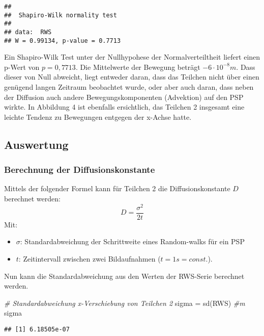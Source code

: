 \documentclass[class=article, crop=false]{standalone}
\newenvironment{Shaded}{\begin{snugshade}}{\end{snugshade}}
\newcommand{\CommentTok}[1]{\textcolor[rgb]{0.56,0.35,0.01}{\textit{#1}}}
\newcommand{\FunctionTok}[1]{\textcolor[rgb]{0.00,0.00,0.00}{#1}}
\newcommand{\NormalTok}[1]{#1}
\newcommand{\OtherTok}[1]{\textcolor[rgb]{0.56,0.35,0.01}{#1}}
\begin{document}
\begin{verbatim}
## 
##  Shapiro-Wilk normality test
## 
## data:  RWS
## W = 0.99134, p-value = 0.7713
\end{verbatim}

Ein Shapiro-Wilk Test unter der Nullhypohese der Normalverteiltheit
liefert einen p-Wert von \(p = 0,7713\). Die Mittelwerte der Bewegung
beträgt \(-6\cdot10^{-8}m\). Dass dieser von Null abweicht, liegt
entweder daran, dass das Teilchen nicht über einen genügend langen
Zeitraum beobachtet wurde, oder aber auch daran, dass neben der
Diffusion auch andere Bewegungskomponenten (Advektion) auf den PSP
wirkte. In Abbildung 4 ist ebenfalls ersichtlich, das Teilchen 2
insgesamt eine leichte Tendenz zu Bewegungen entgegen der x-Achse hatte.

\hypertarget{auswertung}{%
\subsection{Auswertung}\label{auswertung}}

\hypertarget{berechnung-der-diffusionskonstante}{%
\subsubsection{Berechnung der
Diffusionskonstante}\label{berechnung-der-diffusionskonstante}}

Mittels der folgender Formel kann für Teilchen 2 die Diffusionskonstante
\(D\) berechnet werden: \[D=\frac{\sigma^2}{2t}\] Mit:

\begin{itemize}
\item $\sigma$: Standardabweichung der Schrittweite eines Random-walks für ein PSP
\item $t$: Zeitintervall zwischen zwei Bildaufnahmen ($t=1s=const.$).
\end{itemize}

Nun kann die Standardabweichung aus den Werten der RWS-Serie berechnet
werden.

\begin{Shaded}
\begin{Highlighting}[]
\CommentTok{\# Standardabweichung x{-}Verschiebung von Teilchen 2}
\NormalTok{sigma }\OtherTok{=} \FunctionTok{sd}\NormalTok{(RWS) }\CommentTok{\#m}
\NormalTok{sigma}
\end{Highlighting}
\end{Shaded}

\begin{verbatim}
## [1] 6.18505e-07
\end{verbatim}
\end{document}
